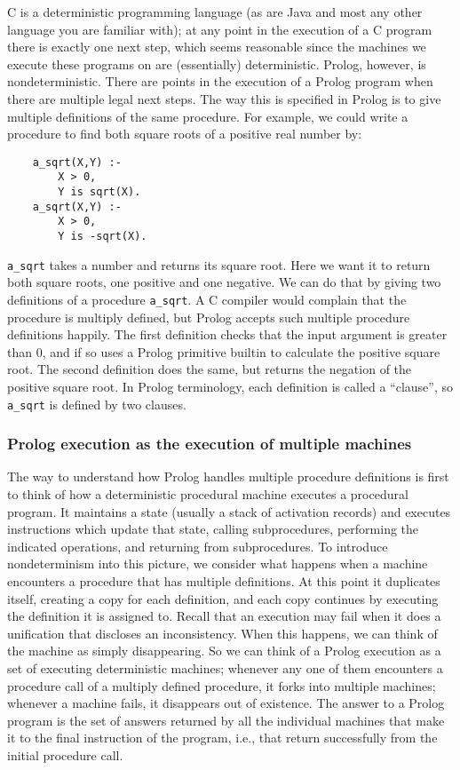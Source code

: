 C is a deterministic programming language (as are Java and most any other language you are familiar with);
at any point in the execution of a C program there is exactly one
next step, which seems reasonable since the machines we execute these programs on are (essentially) deterministic.  
Prolog, however, is nondeterministic.  There are points in
the execution of a Prolog program when there are multiple legal next
steps.  The way this is specified in Prolog is to give multiple
definitions of the same procedure.  For example, we could write a
procedure to find both square roots of a positive real number by:
\begin{verbatim}
    a_sqrt(X,Y) :-
        X > 0,
        Y is sqrt(X).
    a_sqrt(X,Y) :-
        X > 0,
        Y is -sqrt(X).
\end{verbatim}
\verb|a_sqrt| takes a number and returns its square root.  Here we want it
to return both square roots, one positive and one negative.  We can do
that by giving two definitions of a procedure \verb|a_sqrt|.  A C
compiler would complain that the procedure is multiply defined, but
Prolog accepts such multiple procedure definitions happily.  The first
definition checks that the input argument is greater than 0, and if so
uses a Prolog primitive builtin to calculate the positive square root.
The second definition does the same, but returns the negation of the
positive square root.  In Prolog terminology, each definition is
called a ``clause'', so \verb|a_sqrt| is defined by two clauses.

\subsubsection{Prolog execution as the execution of multiple machines}

The way to understand how Prolog handles multiple procedure
definitions is first to think of how a deterministic procedural
machine executes a procedural program.  It maintains a state (usually
a stack of activation records) and executes instructions which update
that state, calling subprocedures, performing the indicated
operations, and returning from subprocedures.  To introduce
nondeterminism into this picture, we consider what happens when a
machine encounters a procedure that has multiple definitions. At this
point it duplicates itself, creating a copy for each definition, and
each copy continues by executing the definition it is assigned to.
Recall that an execution may fail when it does a unification that
discloses an inconsistency.  When this happens, we can think of the
machine as simply disappearing.  So we can think of a Prolog execution
as a set of executing deterministic machines; whenever any one of them
encounters a procedure call of a multiply defined procedure, it forks
into multiple machines; whenever a machine fails, it disappears out of
existence.  The answer to a Prolog program is the set of answers
returned by all the individual machines that make it to the final
instruction of the program, i.e., that return successfully from the
initial procedure call.

